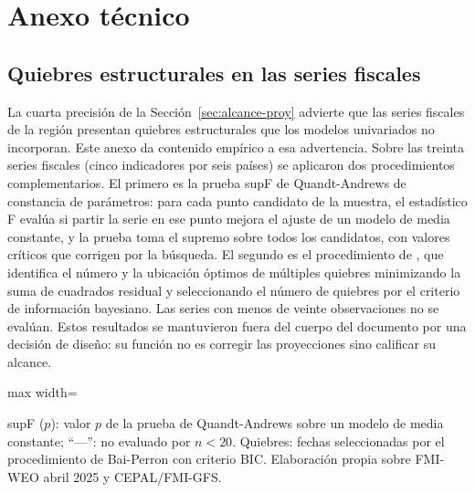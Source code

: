 \documentclass[12pt, letterpaper]{article}
\begin{document}
\newpage
\section{Anexo técnico}
\label{ap:tecnico}

\subsection{Quiebres estructurales en las series fiscales}
\label{ap:quiebres}

La cuarta precisión de la Sección~\ref{sec:alcance-proy} advierte que las series
fiscales de la región presentan quiebres estructurales que los modelos univariados
no incorporan. Este anexo da contenido empírico a esa advertencia. Sobre las
treinta series fiscales (cinco indicadores por seis países) se aplicaron dos
procedimientos complementarios. El primero es la prueba supF de Quandt-Andrews de
constancia de parámetros: para cada punto candidato de la muestra, el estadístico
F evalúa si partir la serie en ese punto mejora el ajuste de un modelo de media
constante, y la prueba toma el supremo sobre todos los candidatos, con valores
críticos que corrigen por la búsqueda. El segundo es el procedimiento de
\citet{baiperron2003}, que identifica el número y la ubicación óptimos de múltiples
quiebres minimizando la suma de cuadrados residual y seleccionando el número de
quiebres por el criterio de información bayesiano. Las series con menos de veinte
observaciones no se evalúan. Estos resultados se mantuvieron fuera del cuerpo del
documento por una decisión de diseño: su función no es corregir las proyecciones
sino calificar su alcance.

\begin{table}[htbp]
  \centering
  \caption{Prueba supF de constancia de parámetros y fechas de quiebre
  (Bai-Perron, criterio BIC), treinta series fiscales.}
  \label{tab:quiebres}
  \footnotesize
  \begin{adjustbox}{max width=\textwidth}
  
  \end{adjustbox}

  \vspace{2pt}
  supF ($p$): valor $p$ de la prueba de Quandt-Andrews sobre un modelo de media
  constante; ``---'': no evaluado por $n<20$. Quiebres: fechas seleccionadas por
  el procedimiento de Bai-Perron con criterio BIC. Elaboración propia sobre
  FMI-WEO abril 2025 y CEPAL/FMI-GFS.
\end{table}
\end{document}
